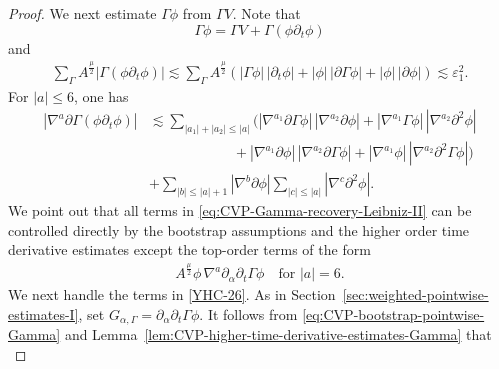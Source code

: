\documentclass[11pt,twoside]{article}
\def\p{\partial}
\def\ve{\varepsilon}
\def\ls{\lesssim}
\theoremstyle{plain}
\theoremstyle{definition}
\theoremstyle{assumption}
\numberwithin{equation}{section}
\begin{document}
\begin{proof}
		We next estimate \(\Gamma\phi\) from \(\Gamma V\). Note that
			\begin{equation}
			\label{eq:CVP-Gamma-zero-recovery-II}
			\Gamma\phi
			=\Gamma V+\Gamma(\phi\p_t\phi)
		\end{equation}
		and
		\begin{equation}
			\label{eq:CVP-Gamma-zero-recovery-error-II}
			\begin{aligned}
				\sum_{\Gamma}
				A^{\frac{\mu}{2}}|\Gamma(\phi\p_t\phi)|
				\ls
				\sum_{\Gamma}
				A^{\frac{\mu}{2}}
				\left(
				|\Gamma\phi|\,|\p_t\phi|
				+
				|\phi|\,|\p\Gamma\phi|
				+
				|\phi|\,|\p\phi|
				\right)
				\ls
				\ve_1^2.
			\end{aligned}
		\end{equation}
		For \(|a|\le 6\), one has
		\begin{equation}
			\label{eq:CVP-Gamma-recovery-Leibniz-II}
			\begin{aligned}
				|\nabla^a\p\Gamma(\phi\p_t\phi)|
				&\ls
				\sum_{|a_1|+|a_2|\le |a|}
				\Big(
				|\nabla^{a_1}\p\Gamma\phi|\,
				|\nabla^{a_2}\p\phi|
				+
				|\nabla^{a_1}\Gamma\phi|\,
				|\nabla^{a_2}\p^2\phi|
				\\
				&\qquad\qquad\qquad+
				|\nabla^{a_1}\p\phi|\,
				|\nabla^{a_2}\p\Gamma\phi|
				+
				|\nabla^{a_1}\phi|\,
				|\nabla^{a_2}\p^2\Gamma\phi|
				\Big)
				\\
				&+
				\sum_{|b|\le |a|+1}
				|\nabla^b\p\phi|
				\sum_{|c|\le |a|}
				|\nabla^c\p^2\phi|.
			\end{aligned}
		\end{equation}
		We point out that all terms in \eqref{eq:CVP-Gamma-recovery-Leibniz-II} can be
		controlled directly by the bootstrap assumptions and the higher order time
		derivative estimates except the top-order terms of the form
		\begin{equation}\label{YHC-26}
			\begin{aligned}
		A^{\frac{\mu}{2}}
		\phi\,\nabla^a\p_\alpha\p_t\Gamma\phi
		\quad\text{for $|a|=6$}.
		\end{aligned}
		\end{equation}
		We next handle the terms in \eqref{YHC-26}. As in
		Section~\ref{sec:weighted-pointwise-estimates-I}, set
		$G_{\alpha,\Gamma}
		=\p_\alpha\p_t\Gamma\phi$.
		It follows from \eqref{eq:CVP-bootstrap-pointwise-Gamma} and
		Lemma~\ref{lem:CVP-higher-time-derivative-estimates-Gamma} that
		\begin{equation}
			\label{eq:CVP-Gamma-interpolation-low-II}

\end{equation}
\end{proof}
\end{document}
